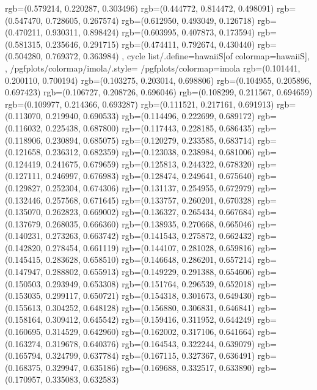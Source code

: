 {{{					rgb=(0.579214, 0.220287, 0.303496)
					rgb=(0.444772, 0.814472, 0.498091)
					rgb=(0.547470, 0.728605, 0.267574)
					rgb=(0.612950, 0.493049, 0.126718)
					rgb=(0.470211, 0.930311, 0.898424)
					rgb=(0.603995, 0.407873, 0.173594)
					rgb=(0.581315, 0.235646, 0.291715)
					rgb=(0.474411, 0.792674, 0.430440)
					rgb=(0.504280, 0.769372, 0.363984)
			},
		cycle list/.define={hawaiiS}{[of colormap=hawaiiS]},
		},
		/pgfplots/colormap/imola/.style={
			/pgfplots/colormap={imola}{%
					rgb=(0.101441, 0.200110, 0.700194)
					rgb=(0.103275, 0.203014, 0.698806)
					rgb=(0.104955, 0.205896, 0.697423)
					rgb=(0.106727, 0.208726, 0.696046)
					rgb=(0.108299, 0.211567, 0.694659)
					rgb=(0.109977, 0.214366, 0.693287)
					rgb=(0.111521, 0.217161, 0.691913)
					rgb=(0.113070, 0.219940, 0.690533)
					rgb=(0.114496, 0.222699, 0.689172)
					rgb=(0.116032, 0.225438, 0.687800)
					rgb=(0.117443, 0.228185, 0.686435)
					rgb=(0.118906, 0.230894, 0.685075)
					rgb=(0.120279, 0.233585, 0.683714)
					rgb=(0.121658, 0.236312, 0.682359)
					rgb=(0.123038, 0.238984, 0.681006)
					rgb=(0.124419, 0.241675, 0.679659)
					rgb=(0.125813, 0.244322, 0.678320)
					rgb=(0.127111, 0.246997, 0.676983)
					rgb=(0.128474, 0.249641, 0.675640)
					rgb=(0.129827, 0.252304, 0.674306)
					rgb=(0.131137, 0.254955, 0.672979)
					rgb=(0.132446, 0.257568, 0.671645)
					rgb=(0.133757, 0.260201, 0.670328)
					rgb=(0.135070, 0.262823, 0.669002)
					rgb=(0.136327, 0.265434, 0.667684)
					rgb=(0.137679, 0.268035, 0.666360)
					rgb=(0.138935, 0.270668, 0.665046)
					rgb=(0.140231, 0.273263, 0.663742)
					rgb=(0.141543, 0.275872, 0.662432)
					rgb=(0.142820, 0.278454, 0.661119)
					rgb=(0.144107, 0.281028, 0.659816)
					rgb=(0.145415, 0.283628, 0.658510)
					rgb=(0.146648, 0.286201, 0.657214)
					rgb=(0.147947, 0.288802, 0.655913)
					rgb=(0.149229, 0.291388, 0.654606)
					rgb=(0.150503, 0.293949, 0.653308)
					rgb=(0.151764, 0.296539, 0.652018)
					rgb=(0.153035, 0.299117, 0.650721)
					rgb=(0.154318, 0.301673, 0.649430)
					rgb=(0.155613, 0.304252, 0.648128)
					rgb=(0.156880, 0.306831, 0.646841)
					rgb=(0.158164, 0.309412, 0.645542)
					rgb=(0.159416, 0.311952, 0.644249)
					rgb=(0.160695, 0.314529, 0.642960)
					rgb=(0.162002, 0.317106, 0.641664)
					rgb=(0.163274, 0.319678, 0.640376)
					rgb=(0.164543, 0.322244, 0.639079)
					rgb=(0.165794, 0.324799, 0.637784)
					rgb=(0.167115, 0.327367, 0.636491)
					rgb=(0.168375, 0.329947, 0.635186)
					rgb=(0.169688, 0.332517, 0.633890)
					rgb=(0.170957, 0.335083, 0.632583)
}}}
